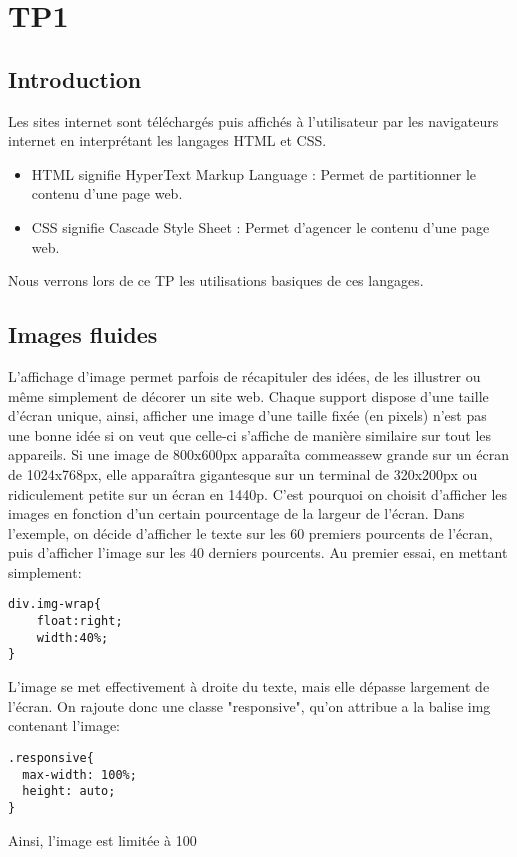 
\chapter{TP1}
\section{Introduction}
Les sites internet sont téléchargés puis affichés à l'utilisateur par les navigateurs internet en interprétant les langages HTML et CSS.

\begin{itemize}
\item HTML signifie HyperText Markup Language : Permet de partitionner le contenu d'une page web.
\item CSS signifie Cascade Style Sheet : Permet d'agencer le contenu d'une page web.
\end{itemize}

Nous verrons lors de ce TP les utilisations basiques de ces langages.

\section{Images fluides}
L'affichage d'image permet parfois de récapituler des idées, de les illustrer ou même simplement de décorer un site web. Chaque support dispose d'une taille d'écran unique, ainsi, afficher une image d'une taille fixée (en pixels) n'est pas une bonne idée si on veut que celle-ci s'affiche de manière similaire sur tout les appareils. Si une image de 800x600px apparaîta commeassew grande sur un écran de 1024x768px, elle apparaîtra gigantesque sur un terminal de 320x200px ou ridiculement petite sur un écran en 1440p. C'est pourquoi on choisit d'afficher les images en fonction d'un certain pourcentage de la largeur de l'écran. Dans l'exemple, on décide d'afficher le texte sur les 60 premiers pourcents de l'écran, puis d'afficher l'image sur les 40 derniers pourcents. Au premier essai, en mettant simplement:
\begin{verbatim}
div.img-wrap{
	float:right;
	width:40%;
}
\end{verbatim}
L'image se met effectivement à droite du texte, mais elle dépasse largement de l'écran. On rajoute donc une classe "responsive", qu'on attribue a la balise img contenant l'image:
\begin{verbatim}
.responsive{
  max-width: 100%;
  height: auto;
}
\end{verbatim}
Ainsi, l'image est limitée à 100%

